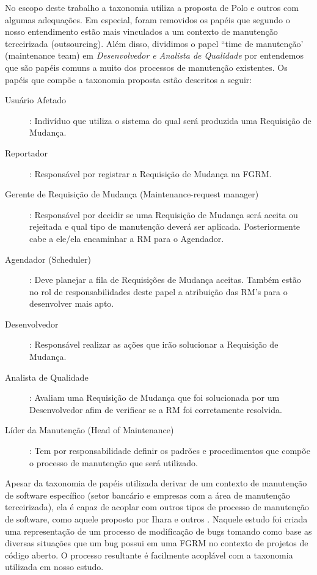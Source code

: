 No escopo deste trabalho a taxonomia utiliza a proposta de Polo e outros com
algumas adequações. Em especial, foram removidos os papéis que segundo o nosso
entendimento estão mais vinculados a um contexto de manutenção terceirizada
(outsourcing). Além disso, dividimos o papel ``time de manutenção' (maintenance
team) em \textit{Desenvolvedor e Analista de Qualidade} por entendemos que são
papéis comuns a muito dos processos de manutenção existentes. Os papéis que
compõe a taxonomia proposta estão descritos a seguir:

\begin{description}
	\item[Usuário Afetado]: Indivíduo que utiliza o sistema do qual será
		produzida uma Requisição de Mudança.
	\item[Reportador]: Responsável por registrar a Requisição de Mudança na
		FGRM\@.
	\item[Gerente de Requisição de Mudança (Maintenance-request manager)]:
		Responsável por decidir se uma Requisição de Mudança será aceita ou
		rejeitada e qual tipo de manutenção deverá ser aplicada. Posteriormente
		cabe a ele/ela encaminhar a RM para o Agendador.
	\item[Agendador (Scheduler)]: Deve planejar a fila de Requisições de Mudança
		aceitas. Também estão no rol de responsabilidades deste papel a
		atribuição das RM's para o desenvolver mais apto.
	\item[Desenvolvedor]: Responsável realizar as ações que irão solucionar a
		Requisição de Mudança.
	\item[Analista de Qualidade]: Avaliam uma Requisição de Mudança que foi
		solucionada por um Desenvolvedor afim de verificar se a RM foi
		corretamente resolvida.
	\item[Líder da Manutenção (Head of Maintenance)]: Tem por responsabilidade
		definir os padrões e procedimentos que compõe o processo de manutenção
		que será utilizado.
\end{description}

Apesar da taxonomia de papéis utilizada derivar de um contexto de manutenção de
software específico (setor bancário e empresas com a área de manutenção
terceirizada), ela é capaz de acoplar com outros tipos de processo de manutenção
de software, como aquele proposto por Ihara e outros
\cite{Ihara:2009:AMI:1595808.1595833}. Naquele estudo foi criada uma
representação de um processo de modificação de bugs tomando como base as
diversas situações que um bug possui em uma FGRM no contexto de projetos de
código aberto. O processo resultante é facilmente acoplável com a taxonomia
utilizada em nosso estudo.


